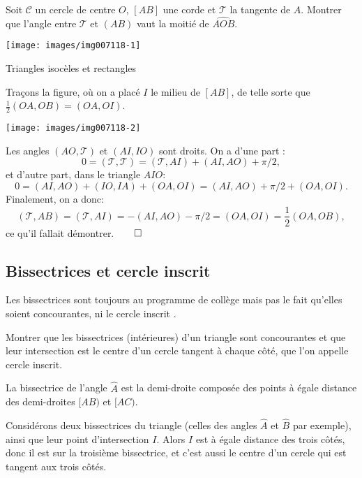 \begin{exo}
Soit $\mathcal C$ un cercle de centre $O$, $[AB]$ une corde et $\mathcal T$ la tangente de $A$. Montrer que l'angle entre $\mathcal T$ et $(AB)$ vaut la moitié de $\widehat{AOB}$.

\begin{center}
\texttt{[image: images/img007118-1]}
\end{center}

\begin{hint}
Triangles isocèles et rectangles
\end{hint}
\begin{sol} 
Traçons la figure, où on a placé $I$ le milieu de $[AB]$, de telle sorte que $\frac12(OA,OB)=(OA,OI)$.

\begin{center}
\texttt{[image: images/img007118-2]}
\end{center}


Les angles $(AO,\mathcal T)$ et $(AI,IO)$ sont droits.
On a d'une part :
\[ 0=(\mathcal T,\mathcal T) =  (\mathcal T,AI) +(AI,AO)+ \pi/2, \]
et d'autre part, dans le triangle $AIO$:
\[ 0=(AI,AO)+(IO,IA)+(OA,OI)=(AI,AO)+\pi/2+(OA,OI).\]
Finalement, on a donc:
\[ (\mathcal T,AB) = (\mathcal T, AI) = -(AI,AO)-\pi/2 = (OA,OI)=\frac{1}{2}(OA,OB),\]
ce qu'il fallait démontrer.$\qed$
\end{sol}  
\end{exo}  


\subsection{Bissectrices et cercle inscrit}

Les bissectrices sont toujours au programme de collège mais pas le fait qu'elles soient concourantes, ni le cercle inscrit .


\begin{exo}
Montrer que les bissectrices (intérieures) d'un triangle sont concourantes et que leur intersection est le centre d'un cercle tangent à chaque côté, que l'on appelle cercle inscrit.
\begin{hint}
La bissectrice de l'angle $\widehat A$ est la demi-droite composée des points à égale distance des demi-droites $[AB)$ et $[AC)$.
\end{hint}
\begin{sol}
Considérons deux bissectrices du triangle (celles des angles $\widehat A$ et $\widehat B$ par exemple), ainsi que leur point d'intersection $I$. Alors $I$ est à égale distance des trois côtés, donc il est sur la troisième bissectrice, et c'est aussi le centre d'un cercle qui est tangent aux trois côtés.


\end{sol}
\end{exo}

